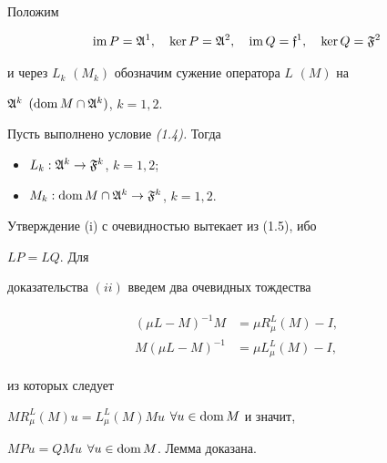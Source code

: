  


Положим 


$$ 


\im P=\frak A^1,\quad \ker P=\frak A^2,\quad \im Q=\frak f^1, 


\quad \ker Q=\frak F^2 


$$ 


и через $L_k$ $(M_k)$ обозначим сужение оператора $L$ $(M)$ на 


$\frak A^k$ $(\operatorname{dom} M\cap\frak A^k)$, $k=1,2$. 


 


\begin{lemm} Пусть выполнено условие {\em (1.4).} Тогда 


\begin{itemize} 


\item[(i)] $L_k:\frak A^k\to \frak F^k$, $k=1,2$; 


\item[(ii)] $M_k:\operatorname{dom} M\cap \frak A^k\to\frak F^k$, $k=1,2$. 


\end{itemize} 


\end{lemm} 


 


\begin{pf} Утверждение (i) с очевидностью вытекает из (1.5), ибо 


$LP=LQ$. Для 


доказательства $(ii)$ введем два очевидных тождества 


\begin{align} 


\begin{split} 


(\mu L-M)^{-1}M &=\mu R^L_\mu(M)-I,\\ 


M(\mu L-M)^{-1} &=\mu L^L_\mu(M)-I, 


\end{split} 


\end{align} 


из которых следует 


$MR^L_\mu(M)u=L^L_\mu(M)Mu$ $\forall u\in\operatorname{dom} M$ и значит, 


$MPu=QMu$ $\forall u\in\operatorname{dom} M$. Лемма доказана. 


\end{pf} 


